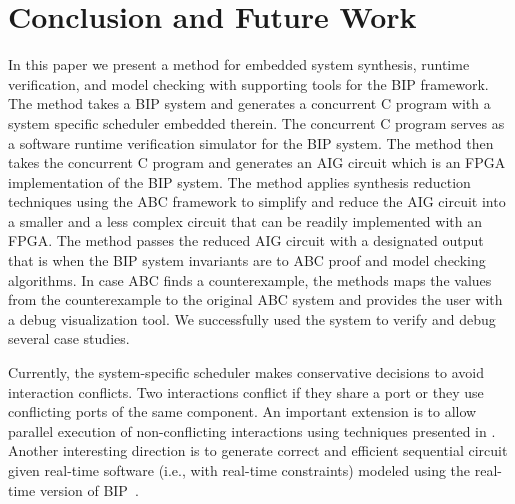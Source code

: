 \section{Conclusion and Future Work}
\label{sec:conclusion}

In this paper we present a method for embedded system synthesis, runtime verification,
and model checking with supporting tools for the BIP framework. 
The method takes a BIP system and generates a concurrent C program with a system 
specific scheduler embedded therein. 
The concurrent C program serves as a software runtime verification simulator for the 
BIP system.
The method then takes the concurrent C program and generates an AIG circuit which is an
FPGA implementation of the BIP system. 
The method applies synthesis reduction techniques using the ABC framework 
to simplify and reduce the AIG circuit
into a smaller and a less complex circuit that can be readily implemented with an 
FPGA. 
The method passes the reduced AIG circuit with a designated output that is \true
when the BIP system invariants are \true to ABC proof and model checking 
algorithms. In case ABC finds a counterexample, the methods maps the values from 
the counterexample to the original ABC system and provides the user with a debug
visualization tool. 
We successfully used the system to verify and debug several case studies. 


Currently, the system-specific scheduler makes conservative decisions to avoid interaction conflicts. Two interactions conflict if they share a port or they use conflicting ports of the same component.
An important extension is to allow parallel execution of non-conflicting interactions using techniques presented in \cite{BonakdarpourBJQS12}. Another interesting direction is to generate correct and efficient sequential circuit given real-time software (i.e., with real-time constraints) modeled using the real-time version of BIP~\cite{AbdellatifCS13}. 
%